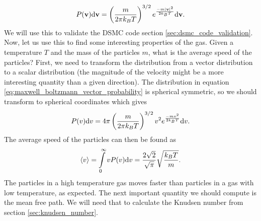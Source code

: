 \begin{align}
	\label{eq:maxwell_boltzmann_vector_probability}
	P(\mathbf v)\mathrm{d}\mathbf v = \left(\frac{m}{2\pi k_B T}\right)^{3/2}e^\frac{-m|\mathbf v|^2}{2k_BT} \mathrm{d}\mathbf v.
\end{align}
We will use this to validate the DSMC code section \ref{sec:dsmc_code_validation}. Now, let us use this to find some interesting properties of the gas. Given a temperature $T$ and the mass of the particles $m$, what is the average speed of the particles? First, we need to transform the distribution from a vector distribution to a scalar distribution (the magnitude of the velocity might be a more interesting quantity than a given direction). The distribution in equation \eqref{eq:maxwell_boltzmann_vector_probability} is spherical symmetric, so we should transform to spherical coordinates which gives
\begin{align}
	\label{eq:maxwell_boltzmann_scalar_probability}
	P(v)\mathrm{d}v = 4\pi\left(\frac{m}{2\pi k_B T}\right)^{3/2}v^2e^\frac{-mv^2}{2k_BT} \mathrm{d}v.
\end{align}
The average speed of the particles can then be found as
\begin{align}
	\label{eq:maxwell_boltzmann_average_speed}
	\langle v\rangle = \int\limits_0^\infty vP(v) \mathrm{d}v = \frac{2\sqrt 2}{\sqrt \pi}\sqrt\frac{k_B T}{m}.
\end{align}
The particles in a high temperature gas moves faster than particles in a gas with low temperature, as expected. The next important quantity we should compute is the mean free path. We will need that to calculate the Knudsen number from section \ref{sec:knudsen_number}.